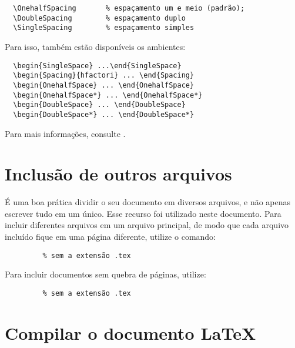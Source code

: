 \begin{verbatim}
  \OnehalfSpacing       % espaçamento um e meio (padrão); 
  \DoubleSpacing        % espaçamento duplo
  \SingleSpacing        % espaçamento simples	
\end{verbatim}

Para isso, também estão disponíveis os ambientes:

\begin{verbatim}
  \begin{SingleSpace} ...\end{SingleSpace}
  \begin{Spacing}{hfactori} ... \end{Spacing}
  \begin{OnehalfSpace} ... \end{OnehalfSpace}
  \begin{OnehalfSpace*} ... \end{OnehalfSpace*}
  \begin{DoubleSpace} ... \end{DoubleSpace}
  \begin{DoubleSpace*} ... \end{DoubleSpace*} 
\end{verbatim}

Para mais informações, consulte .

\section{Inclusão de outros arquivos}\label{sec-include}

É uma boa prática dividir o seu documento em diversos arquivos, e não
apenas escrever tudo em um único. Esse recurso foi utilizado neste
documento. Para incluir diferentes arquivos em um arquivo principal,
de modo que cada arquivo incluído fique em uma página diferente, utilize o
comando:

\begin{verbatim}
         % sem a extensão .tex
\end{verbatim}

Para incluir documentos sem quebra de páginas, utilize:

\begin{verbatim}
         % sem a extensão .tex
\end{verbatim}

\section{Compilar o documento \LaTeX}

